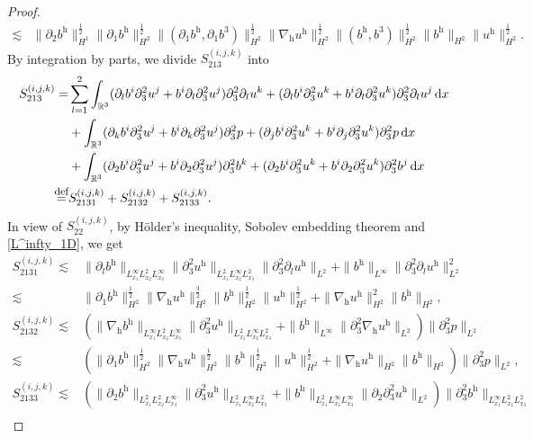 \documentclass[11pt]{amsart}
\theoremstyle{definition}
\newcommand{\R}{\mathbb{R}}
\newcommand{\h}{\mathrm{h}}
\def\eqdefa{\buildrel\hbox{\footnotesize def}\over =}
\newcommand{\dx}{\,{\rm d}x}
\newcommand{\nablah}{\nabla_{\mathrm{h}}}
\numberwithin{equation}{section}
\begin{document}
\begin{proof}
\begin{align}
		\lesssim&\|\partial_2b^\h\|_{H^1}^\frac12\|\partial_1b^\h\|_{H^2}^\frac12\|(\partial_1b^\h,\partial_1b^3)\|_{H^2}^\frac12\|\nablah u^\h\|_{H^2}^\frac12\|(b^\h,b^3)\|_{H^2}^\frac12\|b^\h\|_{H^2}\|u^\h\|_{H^2}^\frac12.
	\end{align}
	By integration by parts, we divide $S^{(i,j,k)}_{213}$ into
	\begin{align*}
		S^{(i,j,k)}_{213}=&\sum_{l=1}^{2}\int_{\R^3}(\partial_lb^i\partial_3^2u^j+b^i\partial_l\partial_3^2u^j)\partial_3^2\partial_l u^k+(\partial_lb^i\partial_3^2u^k+b^i\partial_l\partial_3^2u^k)\partial_3^2\partial_l u^j\dx\\
		&+\int_{\R^3}(\partial_kb^i\partial_3^2u^j+b^i\partial_k\partial_3^2u^j)\partial_3^2p+(\partial_jb^i\partial_3^2u^k+b^i\partial_j\partial_3^2u^k)\partial_3^2p\dx\\
		&+\int_{\R^3}(\partial_2b^i\partial_3^2u^j+b^i\partial_2\partial_3^2u^j)\partial_3^2b^k+(\partial_2b^i\partial_3^2u^k+b^i\partial_2\partial_3^2u^k)\partial_3^2b^j\dx\\
		\eqdefa& S^{(i,j,k)}_{2131}+S^{(i,j,k)}_{2132}+S^{(i,j,k)}_{2133}.
	\end{align*}
	In view of $S^{(i,j,k)}_{22}$, by H\"older's inequality, Sobolev embedding theorem and \eqref{L^infty_1D}, we get
	\begin{align}
		S^{(i,j,k)}_{2131}\lesssim&\|\partial_l b^\h\|_{L^\infty_{x_1}L^2_{x_2}L^\infty_{x_3}}\|\partial_3^2u^\h\|_{L^2_{x_1}L^\infty_{x_2}L^2_{x_3}}\|\partial_3^2\partial_l u^\h\|_{L^2}+\|b^\h\|_{L^\infty}\|\partial_3^2\partial_l u^\h\|_{L^2}^2\nonumber\\
		\lesssim&\|\partial_1b^\h\|_{H^2}^\frac12\|\nablah u^\h\|_{H^2}^\frac32\| b^\h\|_{H^2}^\frac12\| u^\h\|_{H^2}^\frac12+\|\nablah u^\h\|_{H^2}^2\|b^\h\|_{H^2},\nonumber\\\label{S2132.0}
		S^{(i,j,k)}_{2132}\lesssim&\left(\|\nablah b^\h\|_{L^\infty_{x_1}L^2_{x_2}L^\infty_{x_3}}\|\partial_3^2u^\h\|_{L^2_{x_1}L^\infty_{x_2}L^2_{x_3}}+\|b^\h\|_{L^\infty}\|\partial_3^2\nablah u^\h\|_{L^2}\right)\|\partial_3^2 p\|_{L^2}\nonumber\\
		\lesssim&\left(\|\partial_1b^\h\|_{H^2}^\frac12\|\nablah u^\h\|_{H^2}^\frac12\| b^\h\|_{H^2}^\frac12\| u^\h\|_{H^2}^\frac12+\|\nablah u^\h\|_{H^2}\|b^\h\|_{H^2}\right)\|\partial_3^2 p\|_{L^2},\\
		S^{(i,j,k)}_{2133}\lesssim&\left(\|\partial_2 b^\h\|_{L^2_{x_1}L^2_{x_2}L^\infty_{x_3}}\|\partial_3^2u^\h\|_{L^2_{x_1}L^\infty_{x_2}L^2_{x_3}}+\|b^\h\|_{L^2_{x_1}L^\infty_{x_2}L^\infty_{x_3}}\|\partial_2\partial_3^2 u^\h\|_{L^2}\right)\|\partial_3^2 b^\h\|_{L^\infty_{x_1}L^2_{x_2}L^2_{x_3}}\nonumber\\

\end{align}
\end{proof}
\end{document}
